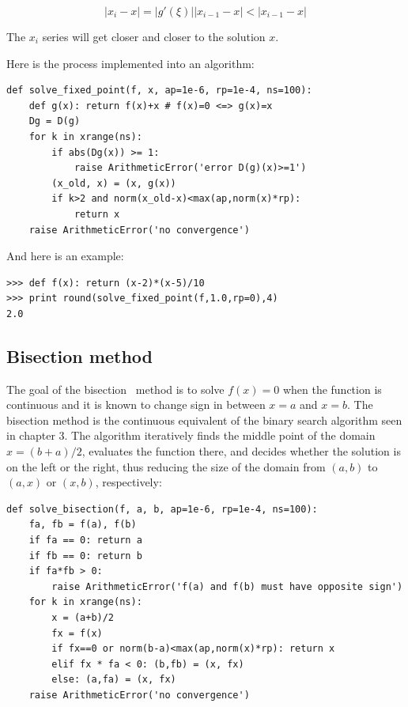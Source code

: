 \documentclass[justified,sixbynine]{tufte-book}
\def\ft{\small\tt}
\theoremstyle{plain}%
\theoremstyle{definition}
\theoremstyle{remark}
\begin{document}
\begin{fullwidth}
\begin{equation}
|x_i - x| = |g'(\xi)||x_{i-1}-x| < |x_{i-1}-x|
\end{equation}

The $x_i$ series will get closer and closer to the solution $x$.

Here is the process implemented into an algorithm:

\begin{lstlisting}[caption={in file: {\ft nlib.py}}]
def solve_fixed_point(f, x, ap=1e-6, rp=1e-4, ns=100):
    def g(x): return f(x)+x # f(x)=0 <=> g(x)=x
    Dg = D(g)
    for k in xrange(ns):
        if abs(Dg(x)) >= 1:
            raise ArithmeticError('error D(g)(x)>=1')
        (x_old, x) = (x, g(x))
        if k>2 and norm(x_old-x)<max(ap,norm(x)*rp):
            return x
    raise ArithmeticError('no convergence')
\end{lstlisting}

And here is an example:

\begin{lstlisting}[caption={in file: {\ft nlib.py}}]
>>> def f(x): return (x-2)*(x-5)/10
>>> print round(solve_fixed_point(f,1.0,rp=0),4)
2.0
\end{lstlisting}

\goodbreak\subsection{Bisection method}


The goal of the bisection~\cite{bisection} method is to solve $f(x)=0$ when the function is continuous and it is known to change sign in between $x=a$ and $x=b$. The bisection method is the continuous equivalent of the binary search algorithm seen in chapter 3. The algorithm iteratively finds the middle point of the domain $x=(b+a)/2$, evaluates the function there, and decides whether the solution is on the left or the right, thus reducing the size of the domain from $(a,b)$ to $(a,x)$ or $(x,b)$, respectively:

\begin{lstlisting}[caption={in file: {\ft nlib.py}}]
def solve_bisection(f, a, b, ap=1e-6, rp=1e-4, ns=100):
    fa, fb = f(a), f(b)
    if fa == 0: return a
    if fb == 0: return b
    if fa*fb > 0:
        raise ArithmeticError('f(a) and f(b) must have opposite sign')
    for k in xrange(ns):
        x = (a+b)/2
        fx = f(x)
        if fx==0 or norm(b-a)<max(ap,norm(x)*rp): return x
        elif fx * fa < 0: (b,fb) = (x, fx)
        else: (a,fa) = (x, fx)
    raise ArithmeticError('no convergence')
\end{lstlisting}


\end{fullwidth}
\end{document}
